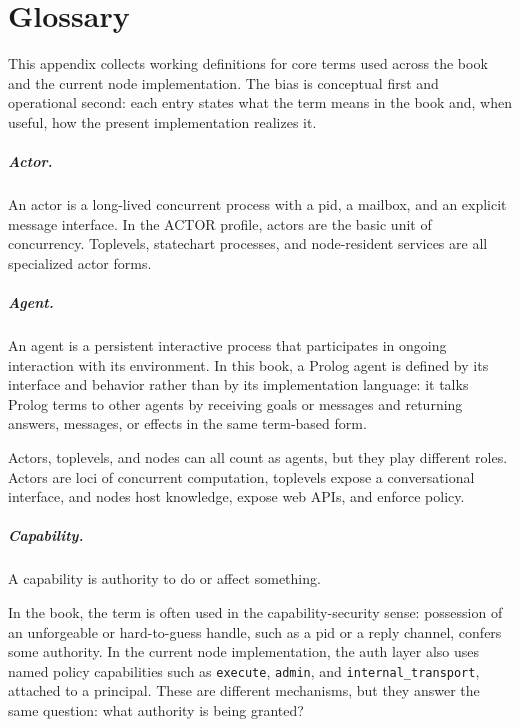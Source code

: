 % 

\chapter{Glossary}\label{sec:glossary}

\noindent This appendix collects working definitions for core terms used across
the book and the current node implementation. The bias is conceptual first and
operational second: each entry states what the term means in the book and, when
useful, how the present implementation realizes it.

\paragraph{Actor.}
An actor is a long-lived concurrent process with a pid, a mailbox, and an
explicit message interface. In the ACTOR profile, actors are the basic unit of
concurrency. Toplevels, statechart processes, and node-resident services are all
specialized actor forms.

\paragraph{Agent.}
An agent is a persistent interactive process that participates in ongoing
interaction with its environment. In this book, a Prolog agent is defined by its
interface and behavior rather than by its implementation language: it talks
Prolog terms to other agents by receiving goals or messages and returning
answers, messages, or effects in the same term-based form.

Actors, toplevels, and nodes can all count as agents, but they play different
roles. Actors are loci of concurrent computation, toplevels expose a
conversational interface, and nodes host knowledge, expose web APIs, and enforce
policy.

\paragraph{Capability.}
A capability is authority to do or affect something.

In the book, the term is often used in the capability-security sense: possession
of an unforgeable or hard-to-guess handle, such as a pid or a reply channel,
confers some authority. In the current node implementation, the auth layer also
uses named policy capabilities such as \texttt{execute}, \texttt{admin}, and
\texttt{internal\_transport}, attached to a principal. These are different
mechanisms, but they answer the same question: what authority is being granted?

